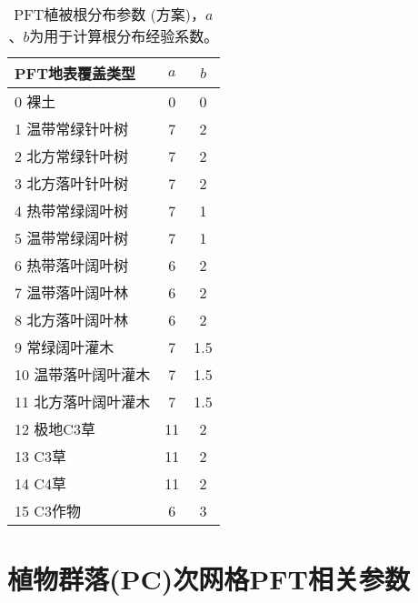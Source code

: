 \begin{table}[]
\centering
\caption{PFT植被根分布参数 (\citet{zeng2001global}方案)，$a$、$b$为用于计算根分布经验系数。}
\label{tab:PFT植被根分布参数}
\begin{tabular}{@{}lcc@{}}
\toprule
PFT地表覆盖类型     & $a$ & $b$ \\ \midrule
 0 裸土        & 0  & 0   \\
 1 温带常绿针叶树   & 7  & 2   \\
 2 北方常绿针叶树   & 7  & 2   \\
 3 北方落叶针叶树   & 7  & 2   \\
 4 热带常绿阔叶树   & 7  & 1   \\
 5 温带常绿阔叶树   & 7  & 1   \\
 6 热带落叶阔叶树   & 6  & 2   \\
 7 温带落叶阔叶林   & 6  & 2   \\
 8 北方落叶阔叶林   & 6  & 2   \\
 9 常绿阔叶灌木    & 7  & 1.5 \\
10 温带落叶阔叶灌木 & 7  & 1.5 \\
11 北方落叶阔叶灌木 & 7  & 1.5 \\
12 极地C3草    & 11 & 2   \\
13 C3草      & 11 & 2   \\
14 C4草      & 11 & 2   \\
15 C3作物     & 6  & 3  \\ \bottomrule
\end{tabular}
\end{table}


\chapter{植物群落(PC)次网格PFT相关参数}\label{植物群落PC次网格PFT相关参数}


